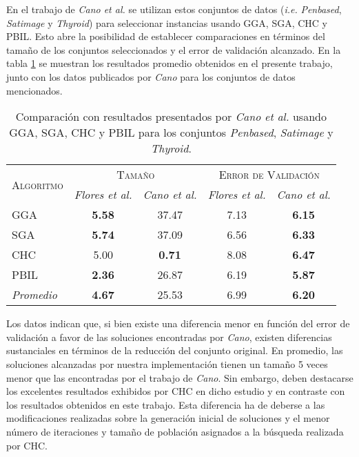 En el trabajo de \emph{Cano et al.} \cite{cano2003using} se utilizan estos conjuntos de datos (\emph{i.e.} \emph{Penbased}, \emph{Satimage} y \emph{Thyroid}) para seleccionar instancias usando GGA, SGA, CHC y PBIL. Esto abre la posibilidad de establecer comparaciones en términos del tamaño de los conjuntos seleccionados y el error de validación alcanzado. En la tabla \ref{res-big-cano} se muestran los resultados promedio obtenidos en el presente trabajo, junto con los datos publicados por \emph{Cano} para los conjuntos de datos mencionados.

\begin{table}[h!]
\centering
\begin{tabular}{l c c c c}
\hline
\multirow{2}{*}{\textsc{Algoritmo}}
	& \multicolumn{2}{c}{\textsc{\hspace*{30pt}Tamaño\hspace*{30pt}}}
	& \multicolumn{2}{c}{\textsc{Error de Validación}} \\\cline{2-5}
 & \scriptsize{\emph{Flores et al.}} & \scriptsize{\emph{Cano et al.}}
 	& \scriptsize{\emph{Flores et al.}} & \scriptsize{\emph{Cano et al.}} \\
\hline
\hline
GGA  & \textbf{5.58} & 37.47 & 7.13 & \textbf{6.15} \\
SGA  & \textbf{5.74} & 37.09 & 6.56 & \textbf{6.33} \\
CHC  & 5.00 &  \textbf{0.71} & 8.08 & \textbf{6.47} \\
PBIL & \textbf{2.36} & 26.87 & 6.19 & \textbf{5.87} \\
\hline
\emph{Promedio} & \textbf{4.67} & 25.53 & 6.99 & \textbf{6.20} \\
\hline
\end{tabular}
\caption[Comparación con resultados presentados por \emph{Cano et al.}]{Comparación con resultados presentados por \emph{Cano et al.} usando GGA, SGA, CHC y PBIL para los conjuntos \emph{Penbased}, \emph{Satimage} y \emph{Thyroid}.}
\label{res-big-cano}
\end{table}

Los datos indican que, si bien existe una diferencia menor en función del error de validación  a favor de las soluciones encontradas por \emph{Cano}, existen diferencias sustanciales en términos de la reducción del conjunto original. En promedio, las soluciones alcanzadas por nuestra implementación tienen un tamaño 5 veces menor que las encontradas por el trabajo de \emph{Cano}. Sin embargo, deben destacarse los excelentes resultados exhibidos por CHC en dicho estudio y en contraste con los resultados obtenidos en este trabajo. Esta diferencia ha de deberse a las modificaciones realizadas sobre la generación inicial de soluciones y el menor número de iteraciones y tamaño de población asignados a la búsqueda realizada por CHC.

